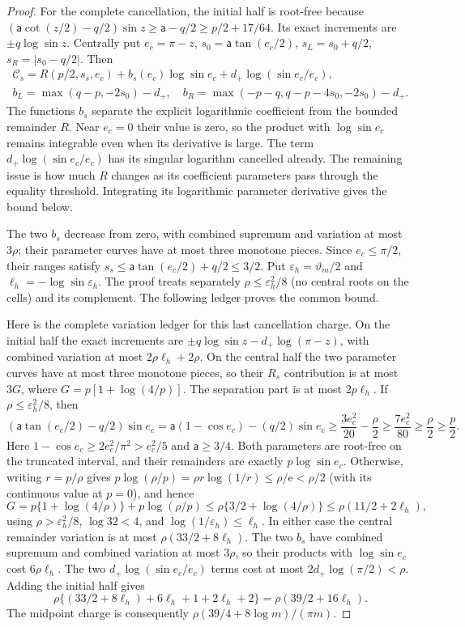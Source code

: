 \begin{proof}
For the complete cancellation, the initial half is root-free because
$(\mathsf{a}\cot(z/2)-q/2)\sin z\geq \mathsf{a}-q/2\geq p/2+17/64$.
Its exact increments are $\pm q\log\sin z$.
Centrally put $e_c=\pi-z$, $s_0=\mathsf{a}\tan(e_c/2)$,
$s_L=s_0+q/2$, $s_R=|s_0-q/2|$. Then
\[
 \begin{gathered}
 \mathcal C_s=R(p/2,s_s,e_c)+b_s(e_c)\log\sin e_c
                                  +d_+\log(\sin e_c/e_c),\\
 b_L=\max(q-p,-2s_0)-d_+,
 \quad b_R=\max(-p-q,q-p-4s_0,-2s_0)-d_+.
 \end{gathered}
\]
The functions $b_s$ separate the explicit logarithmic coefficient
from the bounded remainder $R$. Near $e_c=0$ their value is zero, so
the product with $\log\sin e_c$ remains integrable even when its
derivative is large. The term $d_+\log(\sin e_c/e_c)$ has its singular
logarithm cancelled already. The remaining issue is how much $R$
changes as its coefficient parameters pass through the equality
threshold. Integrating its logarithmic parameter derivative gives the
bound below.

The two $b_s$ decrease from zero, with combined supremum and
variation at most $3\rho$; their parameter curves have at most three
monotone pieces. Since $e_c\leq\pi/2$, their ranges satisfy
$s_s\leq\mathsf a\tan(e_c/2)+q/2\leq3/2$. Put $\varepsilon_h=\vartheta_m/2$ and
$\ell_h=-\log\sin\varepsilon_h$. The proof treats separately
$\rho\leq\varepsilon_h^2/8$ (no central roots on the cells) and its
complement. The following ledger proves the common bound.

Here is the complete variation ledger for this last cancellation
charge. On the initial half the exact increments are
$\pm q\log\sin z-d_+\log(\pi-z)$, with combined variation at
most $2\rho\ell_h+2\rho$. On the central half the two parameter
curves have at most three monotone pieces, so their $R_s$ contribution
is at most $3G$, where $G=p[1+\log(4/p)]$. The separation part is
at most $2p\ell_h$.
If $\rho\leq\varepsilon_h^2/8$, then
\[
 (\mathsf{a}\tan(e_c/2)-q/2)\sin e_c
 =\mathsf{a}(1-\cos e_c)-(q/2)\sin e_c
 \geq\frac{3e_c^2}{20}-\frac\rho2
 \geq\frac{7e_c^2}{80}\geq\frac\rho2\geq\frac p2.
\]
Here $1-\cos e_c\geq2e_c^2/\pi^2>e_c^2/5$ and $\mathsf{a}\geq3/4$.
Both parameters are root-free on the truncated interval, and their
remainders are exactly $p\log\sin e_c$. Otherwise, writing $r=p/\rho$ gives
$p\log(\rho/p)=\rho r\log(1/r)\leq\rho/\mathrm e<\rho/2$
(with its continuous value at $p=0$), and hence
\[
 G=p\{1+\log(4/\rho)\}+p\log(\rho/p)
 \leq\rho\{3/2+\log(4/\rho)\}
 \leq\rho(11/2+2\ell_h),
\]
using $\rho>\varepsilon_h^2/8$, $\log32<4$, and
$\log(1/\varepsilon_h)\leq\ell_h$.
In either case the central remainder variation is at most
$\rho(33/2+8\ell_h)$. The two $b_s$ have combined supremum and
combined variation at most $3\rho$, so their products with
$\log\sin e_c$ cost $6\rho\ell_h$. The two
$d_+\log(\sin e_c/e_c)$ terms cost at most
$2d_+\log(\pi/2)<\rho$. Adding the initial half gives
\[
 \rho\{(33/2+8\ell_h)+6\ell_h+1+2\ell_h+2\}
 =\rho(39/2+16\ell_h).
\]
The midpoint charge is consequently
$\rho(39/4+8\log m)/(\pi m)$.


\end{proof}
